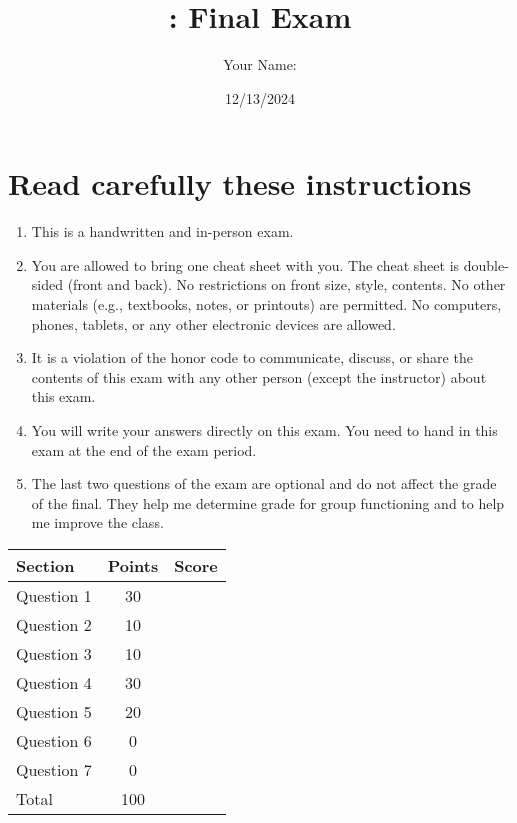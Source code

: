\documentclass[11pt]{article}
\author{Your Name:}
\date{12/13/2024}
\title{\classname{}: Final Exam}
\begin{document}
\maketitle
\section*{Read carefully these instructions}

\begin{enumerate}
\item This is a handwritten and in-person exam. 

\item You are allowed to bring one cheat sheet with you. The cheat sheet is double-sided (front and back).  No restrictions on front size, style, contents.  No other materials (e.g., textbooks, notes, or printouts) are permitted. No computers, phones, tablets, or any other electronic devices are allowed.

\item It is a violation of the honor code to communicate, discuss, or share the contents of this exam with any other person (except the instructor) about this exam.

\item You will write your answers directly on this exam.  You need to hand in this exam at the end of the exam period. 

\item The last two questions of the exam are optional and do not affect the grade of the final.  They help me determine grade for group functioning and to help me improve the class.
  
\end{enumerate}


\begin{center}
  \begin{tabular}{lcc}
    \toprule
    Section		&	Points	&	Score \\
    \midrule
    Question 1	&	 30	& \\
    Question 2	&	 10	& \\
    Question 3 	&	 10	& \\
    Question 4 	&	 30	& \\
    Question 5 	&	 20	& \\
    \midrule
    Question 6 	&	 0	& \\
    Question 7 	&	 0	& \\
    \midrule
    Total		&	100	& \\
    \bottomrule
  \end{tabular}
\end{center}
\end{document}
